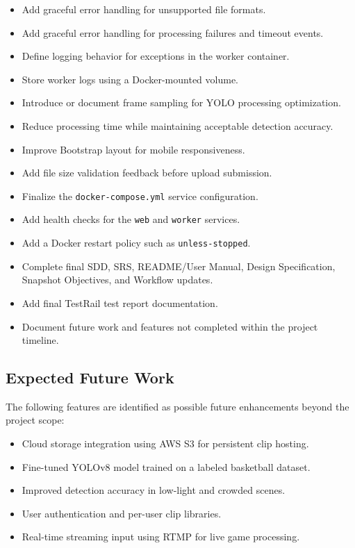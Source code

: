 \documentclass[12pt]{article}
\begin{document}
\begin{itemize}[noitemsep]
    \item Add graceful error handling for unsupported file formats.
    \item Add graceful error handling for processing failures and timeout events.
    \item Define logging behavior for exceptions in the worker container.
    \item Store worker logs using a Docker-mounted volume.
    \item Introduce or document frame sampling for YOLO processing optimization.
    \item Reduce processing time while maintaining acceptable detection accuracy.
    \item Improve Bootstrap layout for mobile responsiveness.
    \item Add file size validation feedback before upload submission.
    \item Finalize the \texttt{docker-compose.yml} service configuration.
    \item Add health checks for the \texttt{web} and \texttt{worker} services.
    \item Add a Docker restart policy such as \texttt{unless-stopped}.
    \item Complete final SDD, SRS, README/User Manual, Design Specification, Snapshot Objectives, and Workflow updates.
    \item Add final TestRail test report documentation.
    \item Document future work and features not completed within the project timeline.
\end{itemize}

\subsection{Expected Future Work}
The following features are identified as possible future enhancements beyond the project scope:

\begin{itemize}[noitemsep]
    \item Cloud storage integration using AWS S3 for persistent clip hosting.
    \item Fine-tuned YOLOv8 model trained on a labeled basketball dataset.
    \item Improved detection accuracy in low-light and crowded scenes.
    \item User authentication and per-user clip libraries.
    \item Real-time streaming input using RTMP for live game processing.
\end{itemize}
\end{document}
